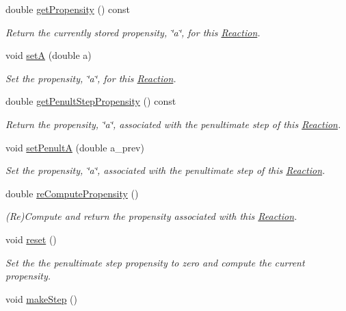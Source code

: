 \begin{DoxyCompactItemize}
double \hyperlink{classRNodeGillespie_afde0f3af2574d0ed517fdd6cbbab8a24}{get\+Propensity} () const 
\begin{DoxyCompactList}\small\item\em Return the currently stored propensity, \char`\"{}a\char`\"{}, for this \hyperlink{classReaction}{Reaction}. \end{DoxyCompactList}\item 
void \hyperlink{classRNodeGillespie_a67dfc9af6a5d302ff54ccd6f1f27a61c}{set\+A} (double a)
\begin{DoxyCompactList}\small\item\em Set the propensity, \char`\"{}a\char`\"{}, for this \hyperlink{classReaction}{Reaction}. \end{DoxyCompactList}\item 
double \hyperlink{classRNodeGillespie_a05088244bc100fb15a852d9a3dfe7088}{get\+Penult\+Step\+Propensity} () const 
\begin{DoxyCompactList}\small\item\em Return the propensity, \char`\"{}a\char`\"{}, associated with the penultimate step of this \hyperlink{classReaction}{Reaction}. \end{DoxyCompactList}\item 
void \hyperlink{classRNodeGillespie_ab5bb90e0267577466f37b2008c1558e3}{set\+Penult\+A} (double a\+\_\+prev)
\begin{DoxyCompactList}\small\item\em Set the propensity, \char`\"{}a\char`\"{}, associated with the penultimate step of this \hyperlink{classReaction}{Reaction}. \end{DoxyCompactList}\item 
double \hyperlink{classRNodeGillespie_af28aaa3b9e56c743a8cdeadbcb9b8ec9}{re\+Compute\+Propensity} ()
\begin{DoxyCompactList}\small\item\em (Re)Compute and return the propensity associated with this \hyperlink{classReaction}{Reaction}. \end{DoxyCompactList}\item 
void \hyperlink{classRNodeGillespie_af8abb653f5bede62ba7f259e26c2060d}{reset} ()
\begin{DoxyCompactList}\small\item\em Set the the penultimate step propensity to zero and compute the current propensity. \end{DoxyCompactList}\item 
void \hyperlink{classRNodeGillespie_a2ed26495d18c940cb56e1f5afead94cf}{make\+Step} ()

\end{DoxyCompactItemize}
